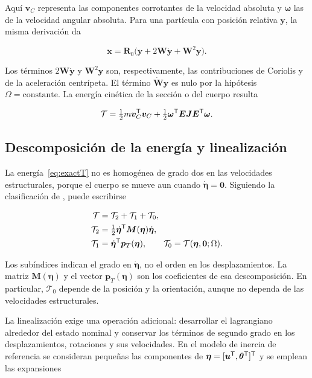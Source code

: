 Aquí $\bm v_C$ representa las componentes corrotantes de la velocidad absoluta y $\bm\omega$ las de la velocidad angular absoluta. Para una partícula con posición relativa $\bm y$, la misma derivación da

\begin{equation}
\ddot{\bm x}=\bm R_0
\big(\ddot{\bm y}+2\bm W\dot{\bm y}+\bm W^2\bm y\big).
\label{eq:aceleracion-transporte}
\end{equation}

Los términos $2\bm W\dot{\bm y}$ y $\bm W^2\bm y$ son, respectivamente, las contribuciones de Coriolis y de la aceleración centrípeta. El término $\dot{\bm W}\bm y$ es nulo por la hipótesis $\Omega=\mathrm{constante}$. La energía cinética de la sección o del cuerpo resulta

\begin{equation}
\mathcal T=\tfrac12m\bm v_C^\mathsf T\bm v_C
+\tfrac12\bm\omega^\mathsf T\bm E\bm J\bm E^\mathsf T\bm\omega.
\label{eq:exactT}
\end{equation}

\subsection{Descomposición de la energía y linealización}
La energía~\eqref{eq:exactT} no es homogénea de grado dos en las velocidades estructurales, porque el cuerpo se mueve aun cuando $\dot{\bm\eta}=\bm0$. Siguiendo la clasificación de \citet[secciones 4.1 y 4.4]{meirovitch1997}, puede escribirse

\begin{align}
\mathcal T&=\mathcal T_2+\mathcal T_1+\mathcal T_0,\nonumber\\
\mathcal T_2&=\tfrac12\dot{\bm\eta}^\mathsf T\bm M(\bm\eta)\dot{\bm\eta},\nonumber\\
\mathcal T_1&=\dot{\bm\eta}^\mathsf T\bm p_T(\bm\eta),\qquad
\mathcal T_0=\mathcal T(\bm\eta,\bm0;\Omega).
\label{eq:descomposicion}
\end{align}

Los subíndices indican el grado en $\dot{\bm\eta}$, no el orden en los desplazamientos. La matriz $\bm M(\bm\eta)$ y el vector $\bm p_T(\bm\eta)$ son los coeficientes de esa descomposición. En particular, $\mathcal T_0$ depende de la posición y la orientación, aunque no dependa de las velocidades estructurales.

La linealización exige una operación adicional: desarrollar el lagrangiano alrededor del estado nominal y conservar los términos de segundo grado en los desplazamientos, rotaciones y sus velocidades. En el modelo de inercia de referencia se consideran pequeñas las componentes de $\bm\eta=[\bm u^\mathsf T,\bm\theta^\mathsf T]^\mathsf T$ y se emplean las expansiones

